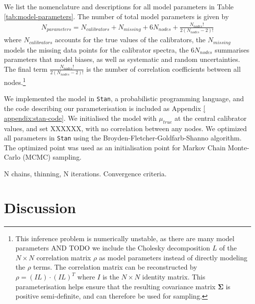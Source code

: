 \documentclass[preprint]{aastex}
\begin{document}
\begin{enumerate}
We list the nomenclature and descriptions for all model parameters in Table 
\ref{tab:model-parameters}. The number of total model parameters is given by
\begin{eqnarray}
    N_{parameters} = N_{calibrators} + N_{missing} + 6N_{nodes} + \frac{N_{nodes}!}{2(N_{nodes} - 2)!}
\end{eqnarray}
where $N_{calibrators}$ accounts for the true values of the calibrators, the
$N_{missing}$ models the missing data points for the calibrator spectra, the
$6N_{nodes}$ summarises parameters that model biases, as well as systematic
and random uncertainties. The final term $\frac{N_{nodes}!}{2(N_{nodes} - 2)!}$
is the number of correlation coefficients between all nodes.\footnote{
This inference problem is numerically unstable, as there are many model parameters
AND TODO
we include the Cholesky decomposition $L$ of the $N \times N$ correlation matrix $\rho$
as model parameters instead of directly modeling the $\rho$ terms.  The correlation
matrix can be reconstructed by $\rho = (IL)\cdot(IL)^T$ where $I$ is the $N \times N$
identity matrix. This parameterisation helps ensure that the resulting covariance
matrix $\mathbf{\Sigma}$ is positive semi-definite, and can therefore be used for
sampling.} 



We implemented the model in \texttt{Stan}, a probabilistic programming
language, and the code describing our parameterisation is included as Appendix \ref{
appendix:stan-code}. We initialised the model with $\mu_{true}$ at the central
calibrator values, and set XXXXXX, with no correlation between any nodes. We
optimized all parameters in \texttt{Stan} using the Broyden-Fletcher-Goldfarb-Shanno
algorithm. The optimized point was used as an initialisation point for Markov Chain
Monte-Carlo (MCMC) sampling.

N chains, thinning, N iterations. Convergence criteria.
 
 







\section{Discussion}
\label{sec:discussion}



\end{enumerate}
\end{document}
